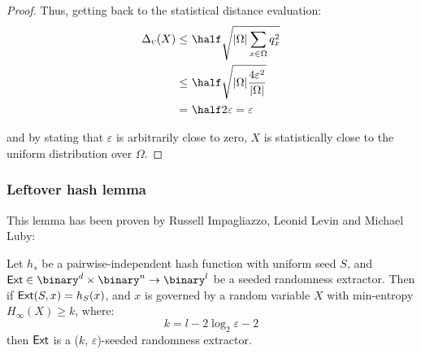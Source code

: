 \begin{proof}
    Thus, getting back to the statistical distance evaluation:
    \begin{align*}
        \sdtu(X) \leq&\ \half \sqrt{|\Omega| \sum_{x \in \Omega} q_x^2}        \\
                 \leq&\ \half \sqrt{|\Omega| \frac{4 \varepsilon^2}{|\Omega|}} \\
                    =&\ \half 2 \varepsilon = \varepsilon                      \\
    \end{align*}

    and by stating that $\varepsilon$ is arbitrarily close to zero, $X$ is statistically close to the uniform distribution over $\Omega$.
\end{proof}

\subsubsection{Leftover hash lemma}

This lemma has been proven by Russell Impagliazzo, Leonid Levin and Michael Luby:

\begin{lemma}
    Let $h_s$ be a pairwise-independent hash function with uniform seed $S$, and $\ext \in \binary^d \times \binary^n \to \binary^l$ be a seeded randomness extractor. Then if $\textup{\textsf{Ext}}(S, x) = h_S(x)$, and $x$ is governed by a random variable $X$ with min-entropy $H_{\infty}(X) \geq k$, where:
    \[
       k = l - 2 \log_2 \varepsilon - 2
    \]
    then $\textup{\textsf{Ext}}$ is a ($k$, $\varepsilon$)-seeded randomness extractor.
\end{lemma}


